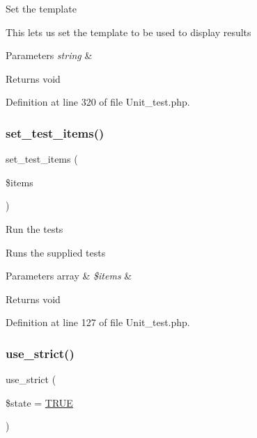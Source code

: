 Set the template

This lets us set the template to be used to display results


\begin{DoxyParams}{Parameters}
{\em string} & \\
\hline
\end{DoxyParams}
\begin{DoxyReturn}{Returns}
void 
\end{DoxyReturn}


Definition at line 320 of file Unit\+\_\+test.\+php.

\mbox{\label{class_c_i___unit__test_a78e364204a36821e23124ae97d447aa3}} 
\subsubsection{\texorpdfstring{set\_test\_items()}{set\_test\_items()}}
{\footnotesize\ttfamily set\+\_\+test\+\_\+items (\begin{DoxyParamCaption}\item[{}]{\$items }\end{DoxyParamCaption})}

Run the tests

Runs the supplied tests


\begin{DoxyParams}[1]{Parameters}
array & {\em \$items} & \\
\hline
\end{DoxyParams}
\begin{DoxyReturn}{Returns}
void 
\end{DoxyReturn}


Definition at line 127 of file Unit\+\_\+test.\+php.

\mbox{\label{class_c_i___unit__test_a3b12a79f69fab4221a0b887bdac1ba83}} 
\subsubsection{\texorpdfstring{use\_strict()}{use\_strict()}}
{\footnotesize\ttfamily use\+\_\+strict (\begin{DoxyParamCaption}\item[{}]{\$state = {\ttfamily \mbox{\hyperlink{constants_8php_ae04a3efe6aa42044f803ee90c2277846}{T\+R\+UE}}} }\end{DoxyParamCaption})}

